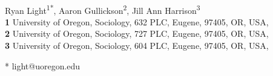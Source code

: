 \documentclass[
  10pt,
  letterpaper,
]{article}
\begin{document}
\vspace*{0.2in}

\begin{flushleft}
{\Large
\textbf{} %
}
\newline
\\
Ryan Light\textsuperscript{1*}, Aaron
Gullickson\textsuperscript{2}, Jill Ann Harrison\textsuperscript{3}
\\
\bigskip
\textbf{1} University of Oregon, Sociology, 632
PLC, Eugene, 97405, OR, USA, \\ \textbf{2} University of
Oregon, Sociology, 727
PLC, Eugene, 97405, OR, USA, \\ \textbf{3} University of
Oregon, Sociology, 604 PLC, Eugene, 97405, OR, USA, 
\bigskip

% 
%





* light@uoregon.edu

\end{flushleft}
\end{document}
